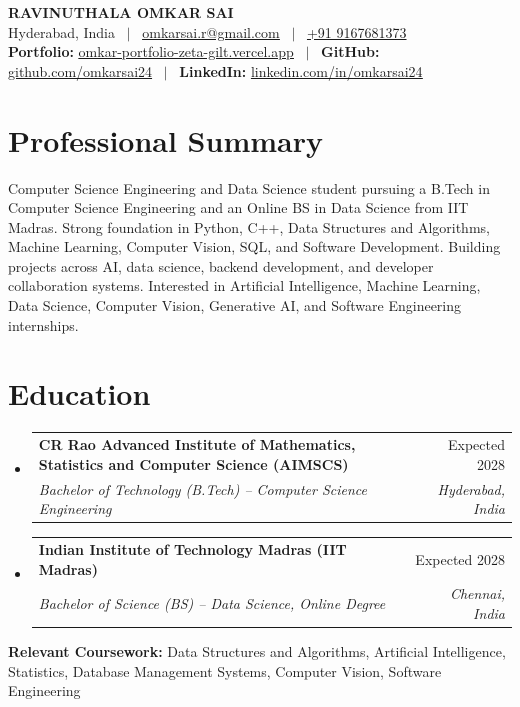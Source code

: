 \documentclass[a4paper,10pt]{article}
\makeatletter
\newcommand{\resumeSubheading}[4]{
  \vspace{-1pt}\item
    \begin{tabular*}{0.98\textwidth}[t]{l@{\extracolsep{\fill}}r}
      \textbf{#1} & #2 \\
      \textit{\small#3} & \textit{\small #4} \\
    \end{tabular*}\vspace{-6pt}
}
\makeatother
\begin{document}
\begin{center}
    {\Huge \textbf{RAVINUTHALA OMKAR SAI}} \\ \vspace{4pt}
    Hyderabad, India \ $|$ \ 
    \href{mailto:omkarsai.r@gmail.com}{\underline{omkarsai.r@gmail.com}} \ $|$ \ 
    \href{tel:+919167681373}{+91 9167681373} \\ \vspace{3pt}
    \textbf{Portfolio:} \href{https://omkar-portfolio-zeta-gilt.vercel.app}{\underline{omkar-portfolio-zeta-gilt.vercel.app}} \ $|$ \ 
    \textbf{GitHub:} \href{https://github.com/omkarsai24}{\underline{github.com/omkarsai24}} \ $|$ \ 
    \textbf{LinkedIn:} \href{https://linkedin.com/in/omkarsai24}{\underline{linkedin.com/in/omkarsai24}}
\end{center}

\section{Professional Summary}
\vspace{2pt}
Computer Science Engineering and Data Science student pursuing a B.Tech in Computer Science Engineering and an Online BS in Data Science from IIT Madras. Strong foundation in Python, C++, Data Structures and Algorithms, Machine Learning, Computer Vision, SQL, and Software Development. Building projects across AI, data science, backend development, and developer collaboration systems. Interested in Artificial Intelligence, Machine Learning, Data Science, Computer Vision, Generative AI, and Software Engineering internships.

\section{Education}
  \begin{itemize}[leftmargin=0in, label={}]
    \resumeSubheading
      {CR Rao Advanced Institute of Mathematics, Statistics and Computer Science (AIMSCS)}{Expected 2028}
      {Bachelor of Technology (B.Tech) -- Computer Science Engineering}{Hyderabad, India}
    \resumeSubheading
      {Indian Institute of Technology Madras (IIT Madras)}{Expected 2028}
      {Bachelor of Science (BS) -- Data Science, Online Degree}{Chennai, India}
  \end{itemize}
  \vspace{-6pt}
  \small{\textbf{Relevant Coursework:} Data Structures and Algorithms, Artificial Intelligence, Statistics, Database Management Systems, Computer Vision, Software Engineering}
\end{document}
